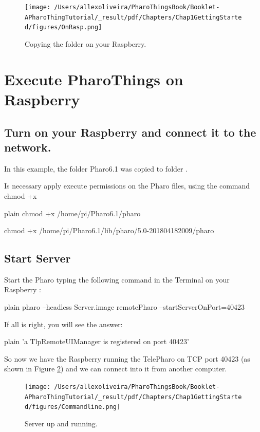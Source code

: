 \documentclass[10pt,twoside,english]{_support/latex/sbabook/sbabook}
\begin{document}
\begin{figure}

\begin{center}
\texttt{[image: /Users/allexoliveira/PharoThingsBook/Booklet-APharoThingTutorial/\_result/pdf/Chapters/Chap1GettingStarted/figures/OnRasp.png]}\caption{Copying the folder on your Raspberry.\label{OnRasp}}\end{center}
\end{figure}

\section{Execute PharoThings on Raspberry}\subsection{Turn on your Raspberry and connect it to the network.}
In this example, the folder Pharo6.1 was copied to folder .

Is necessary apply execute permissions on the Pharo files, using the command chmod +x

\begin{displaycode}{plain}
chmod +x /home/pi/Pharo6.1/pharo

chmod +x /home/pi/Pharo6.1/lib/pharo/5.0-201804182009/pharo
\end{displaycode}
\subsection{Start Server}
Start the Pharo typing the following command in the Terminal on your Raspberry :

\begin{displaycode}{plain}
pharo --headless Server.image remotePharo --startServerOnPort=40423
\end{displaycode}

If all is right, you will see the answer:

\begin{displaycode}{plain}
'a TlpRemoteUIManager is registered on port 40423'
\end{displaycode}

So now we have the Raspberry running the TelePharo on TCP port 40423 (as shown in Figure \ref{Commandline}) and we can connect into it from another computer.


\begin{figure}

\begin{center}
\texttt{[image: /Users/allexoliveira/PharoThingsBook/Booklet-APharoThingTutorial/\_result/pdf/Chapters/Chap1GettingStarted/figures/Commandline.png]}\caption{Server up and running.\label{Commandline}}\end{center}
\end{figure}
\end{document}
